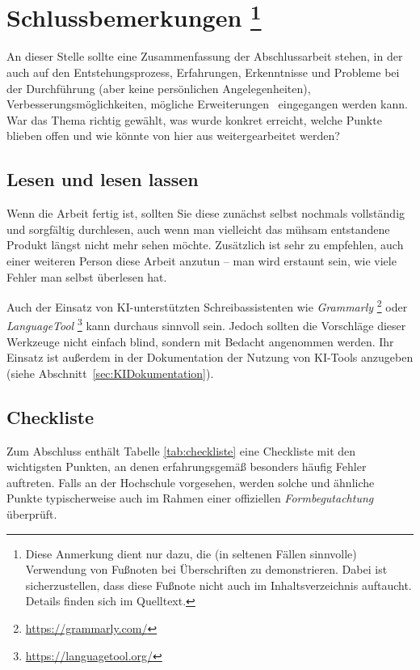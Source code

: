 \chapter[Schlussbemerkungen]{Schlussbemerkungen%
\protect\footnote{Diese Anmerkung dient nur dazu, die (in seltenen Fällen
sinnvolle) Verwendung von Fußnoten bei Überschriften zu demonstrieren.
Dabei ist sicherzustellen, dass diese Fußnote nicht auch im Inhaltsverzeichnis
auftaucht. Details finden sich im Quelltext.}}%
\label{cha:Schluss}

An dieser Stelle sollte eine Zusammenfassung der Abschlussarbeit stehen, in
der auch auf den Entstehungsprozess, Erfahrungen, Erkenntnisse und Probleme bei
der Durchführung (aber keine persönlichen Angelegenheiten), 
Verbesserungsmöglichkeiten, mögliche Erweiterungen \usw\
eingegangen werden kann. War das Thema richtig gewählt, was wurde konkret
erreicht, welche Punkte blieben offen und wie könnte von hier aus
weitergearbeitet werden?


\section{Lesen und lesen lassen}

Wenn die Arbeit fertig ist, sollten Sie diese zunächst selbst nochmals
vollständig und sorgfältig durchlesen, auch wenn man vielleicht das mühsam
entstandene Produkt längst nicht mehr sehen möchte. Zusätzlich ist sehr zu
empfehlen, auch einer weiteren Person diese Arbeit anzutun -- man wird
erstaunt sein, wie viele Fehler man selbst überlesen hat.

Auch der Einsatz von KI-unterstützten Schreibassistenten wie \zB
\emph{Grammarly}%
\footnote{\url{https://grammarly.com/}} oder \emph{LanguageTool}%
\footnote{\url{https://languagetool.org/}} kann durchaus sinnvoll sein.
Jedoch sollten die Vorschläge dieser Werkzeuge nicht einfach blind, sondern
mit Bedacht angenommen werden. Ihr Einsatz ist außerdem in der Dokumentation
der Nutzung von KI-Tools anzugeben (siehe Abschnitt~\ref{sec:KIDokumentation}).


\section{Checkliste}

Zum Abschluss enthält Tabelle \ref{tab:checkliste} eine Checkliste mit den
wichtigsten Punkten, an denen erfahrungsgemäß besonders häufig Fehler
auftreten. Falls an der Hochschule vorgesehen, werden solche und ähnliche
Punkte typischerweise auch im Rahmen einer offiziellen \emph{Formbegutachtung}
überprüft.


